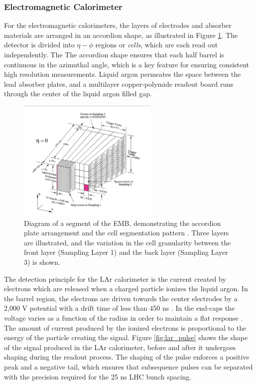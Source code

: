 \subsubsection{Electromagnetic Calorimeter}
For the electromagnetic calorimeters, the layers of electrodes and absorber materials are arranged in an accordion shape, as illustrated in Figure \ref{fig:lar_accordion}. The detector is divided into $\eta-\phi$ regions or \textit{cells}, which are each read out independently. The The accordion shape ensures that each half barrel is continuous in the azimuthal angle, which is a key feature for ensuring consistent high resolution measurements. Liquid argon permeates the space between the lead absorber plates, and a multilayer copper-polymide readout board runs through the center of the liquid argon filled gap. \par

\begin{figure}
        \centering
	\includegraphics[width=0.6\textwidth]{figures/ch4/lar_accordion.png}
	\caption{Diagram of a segment of the EMB, demonstrating the accordion plate arrangement and the cell segmentation pattern \cite{lar_tdr}. Three layers are illustrated, and the variation in the cell granularity between the front layer (Sampling Layer 1) and the back layer (Sampling Layer 3) is shown. }
	\label{fig:lar_accordion}
\end{figure}

The detection principle for the LAr calorimeter is the current created by electrons which are released when a charged particle ionizes the liquid argon. In the barrel region, the electrons are driven towards the center electrodes by a 2,000 V potential with a drift time of less than 450 ns \cite{lar_overview}. In the end-caps the voltage varies as a function of the radius in order to maintain a flat response \cite{lar_tdr}. The amount of current produced by the ionized electrons is proportional to the energy of the particle creating the signal. Figure \ref{fig:lar_pulse} shows the shape of the signal produced in the LAr calorimeter, before and after it undergoes shaping during the readout process. The shaping of the pulse enforces a positive peak and a negative tail, which ensures that subsequence pulses can be separated with the precision required for the 25 ns LHC bunch spacing. \par

